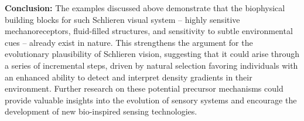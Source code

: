\documentclass[11pt]{article}
\begin{document}
\noindent\textbf{Conclusion:}
The examples discussed above demonstrate that the biophysical building blocks for such Schlieren visual system – highly sensitive mechanoreceptors, fluid-filled structures, and sensitivity to subtle environmental cues – already exist in nature. This strengthens the argument for the evolutionary plausibility of Schlieren vision, suggesting that it could arise through a series of incremental steps, driven by natural selection favoring individuals with an enhanced ability to detect and interpret density gradients in their environment. Further research on these potential precursor mechanisms could provide valuable insights into the evolution of sensory systems and encourage the development of new bio-inspired sensing technologies.
\end{document}
